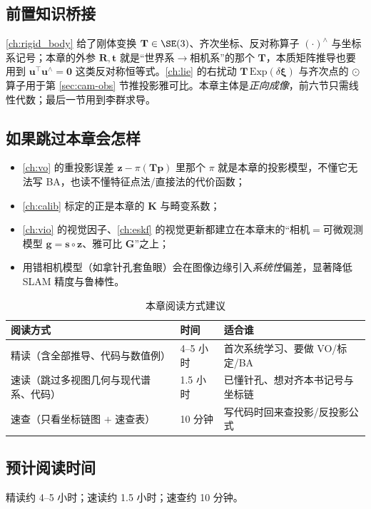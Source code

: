 \subsection*{前置知识桥接}
\cref{ch:rigid_body} 给了刚体变换 $\mathbf{T}\in\SE(3)$、齐次坐标、反对称算子 $(\cdot)^\wedge$ 与坐标系记号；本章的外参 $\mathbf{R},\mathbf{t}$ 就是“世界系$\to$相机系”的那个 $\mathbf{T}$，本质矩阵推导也要用到 $\mathbf{u}^\top\mathbf{u}^\wedge=\mathbf{0}$ 这类反对称恒等式。\cref{ch:lie} 的右扰动 $\mathbf{T}\,\mathrm{Exp}(\delta\boldsymbol\xi)$ 与齐次点的 $\odot$ 算子用于第 \ref{sec:cam-obs} 节推投影雅可比。本章主体是\emph{正向成像}，前六节只需线性代数；最后一节用到李群求导。

\subsection*{如果跳过本章会怎样}
\begin{itemize}
  \item \cref{ch:vo} 的重投影误差 $\mathbf{z}-\pi(\mathbf{T}\mathbf{p})$ 里那个 $\pi$ 就是本章的投影模型，不懂它无法写 BA，也读不懂特征点法/直接法的代价函数；
  \item \cref{ch:calib} 标定的正是本章的 $\mathbf{K}$ 与畸变系数；
  \item \cref{ch:vio} 的视觉因子、\cref{ch:eskf} 的视觉更新都建立在本章末的“相机$=$可微观测模型 $\mathbf{g}=\mathbf{s}\circ\mathbf{z}$、雅可比 $\mathbf{G}$”之上；
  \item 用错相机模型（如拿针孔套鱼眼）会在图像边缘引入\emph{系统性}偏差，显著降低 SLAM 精度与鲁棒性\cite{carlone2026handbook}。
\end{itemize}

\begin{table}[H]\centering\small
\caption{本章阅读方式建议}
\begin{tabular}{lll}
\toprule
阅读方式 & 时间 & 适合谁 \\
\midrule
精读（含全部推导、代码与数值例） & 4--5 小时 & 首次系统学习、要做 VO/标定/BA \\
速读（跳过多视图几何与现代谱系、代码） & 1.5 小时 & 已懂针孔、想对齐本书记号与坐标链 \\
速查（只看坐标链图 $+$ 速查表） & 10 分钟 & 写代码时回来查投影/反投影公式 \\
\bottomrule
\end{tabular}
\end{table}

\subsection*{预计阅读时间}
精读约 4--5 小时；速读约 1.5 小时；速查约 10 分钟。

